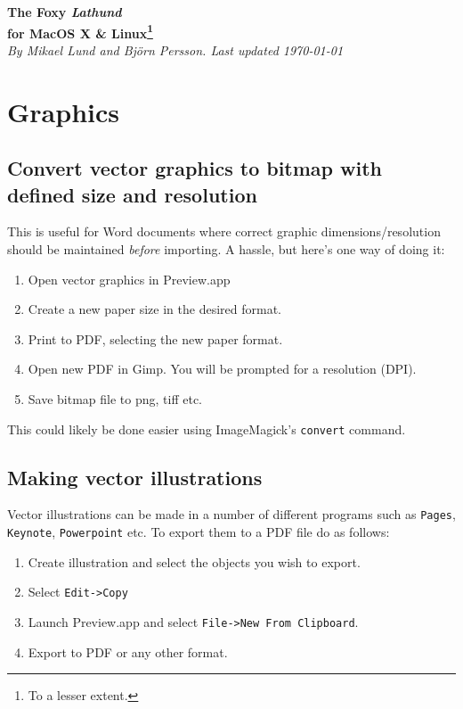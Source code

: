 \documentclass[a4paper,10pt]{article}
\begin{document}
\renewcommand{\thefootnote}{\fnsymbol{footnote}}%

\begin{center}
\Huge
\textbf{The Foxy \emph{Lathund}\\ for MacOS X \& Linux\footnote[2]{To a lesser extent.}}\\
\normalsize
\vspace{0.5cm}
\emph{By Mikael Lund and Bj\"orn Persson.
Last updated \today}
\end{center}

\tableofcontents


\section{Graphics}
\subsection{Convert vector graphics to bitmap with defined size and resolution}
This is useful for Word documents where correct graphic dimensions/resolution should be maintained \emph{before} importing. A hassle, but here's one way of doing it:
\begin{enumerate}
\item Open vector graphics in Preview.app
\item Create a new paper size in the desired format.
\item Print to PDF, selecting the new paper format.
\item Open new PDF in Gimp. You will be prompted for a resolution (DPI).
\item Save bitmap file to png, tiff etc.
\end{enumerate}
This could likely be done easier using ImageMagick's \verb"convert" command.

\subsection{Making vector illustrations}
Vector illustrations can be made in a number of different programs such as
\verb+Pages+, \verb+Keynote+, \verb+Powerpoint+ etc. To export them to a PDF file do as follows:
\begin{enumerate}
\item Create illustration and select the objects you wish to export.
\item Select \verb+Edit->Copy+
\item Launch Preview.app and select \verb+File->New From Clipboard+.
\item Export to PDF or any other format.
\end{enumerate}
\end{document}
